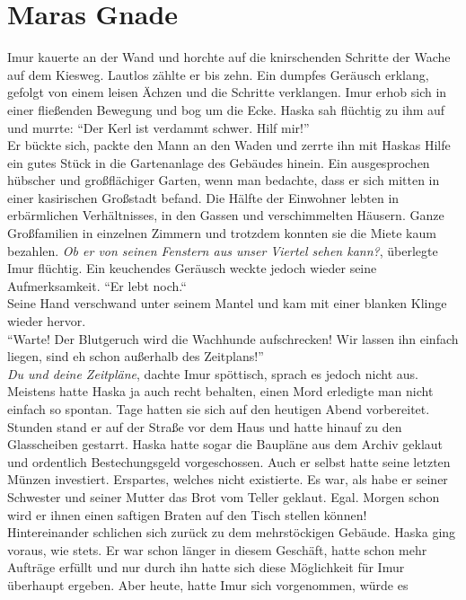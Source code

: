 \chapter{Maras Gnade}

Imur kauerte an der Wand und horchte auf die knirschenden Schritte der Wache auf dem Kiesweg. 
Lautlos zählte er bis zehn. Ein dumpfes Geräusch erklang, gefolgt von einem leisen Ächzen und die 
Schritte verklangen. Imur erhob sich in einer fließenden Bewegung und bog um die Ecke. Haska 
sah flüchtig zu ihm auf und murrte: ``Der Kerl ist verdammt schwer. Hilf mir!''\\
Er bückte sich, packte den Mann an den Waden und zerrte ihn mit Haskas Hilfe ein gutes Stück in 
die Gartenanlage des Gebäudes hinein. Ein ausgesprochen hübscher und großflächiger Garten, wenn man 
bedachte, dass er sich mitten in einer kasirischen Großstadt befand. Die Hälfte der Einwohner 
lebten in erbärmlichen Verhältnisses, in den Gassen und verschimmelten Häusern. Ganze Großfamilien 
in einzelnen Zimmern und trotzdem konnten sie die Miete kaum bezahlen. \textit{Ob er von seinen 
Fenstern aus unser Viertel sehen kann?}, überlegte Imur flüchtig. Ein keuchendes Geräusch weckte 
jedoch wieder seine Aufmerksamkeit. ``Er lebt noch.``\\
Seine Hand verschwand unter seinem Mantel und kam mit einer blanken Klinge wieder hervor.\\
``Warte! Der Blutgeruch wird die Wachhunde aufschrecken! Wir lassen ihn einfach liegen, sind eh 
schon außerhalb des Zeitplans!''\\
\textit{Du und deine Zeitpläne}, dachte Imur spöttisch, sprach es jedoch nicht aus. Meistens hatte 
Haska ja auch recht behalten, einen Mord erledigte man nicht einfach so spontan. Tage hatten sie 
sich auf den heutigen Abend vorbereitet. Stunden stand er auf der Straße vor dem Haus und hatte 
hinauf zu den Glasscheiben gestarrt. Haska hatte sogar die Baupläne aus dem Archiv geklaut und 
ordentlich Bestechungsgeld vorgeschossen. Auch er selbst hatte seine letzten Münzen investiert. 
Erspartes, welches nicht existierte. Es war, als habe er seiner Schwester und seiner Mutter das 
Brot vom Teller geklaut. Egal. Morgen schon wird er ihnen einen saftigen Braten auf den Tisch 
stellen können!\\
Hintereinander schlichen sich zurück zu dem mehrstöckigen Gebäude. Haska ging voraus, wie stets. Er 
war schon länger in diesem Geschäft, hatte schon mehr Aufträge erfüllt und nur durch ihn hatte sich 
diese Möglichkeit für Imur überhaupt ergeben. Aber heute, hatte Imur sich vorgenommen, würde es 
